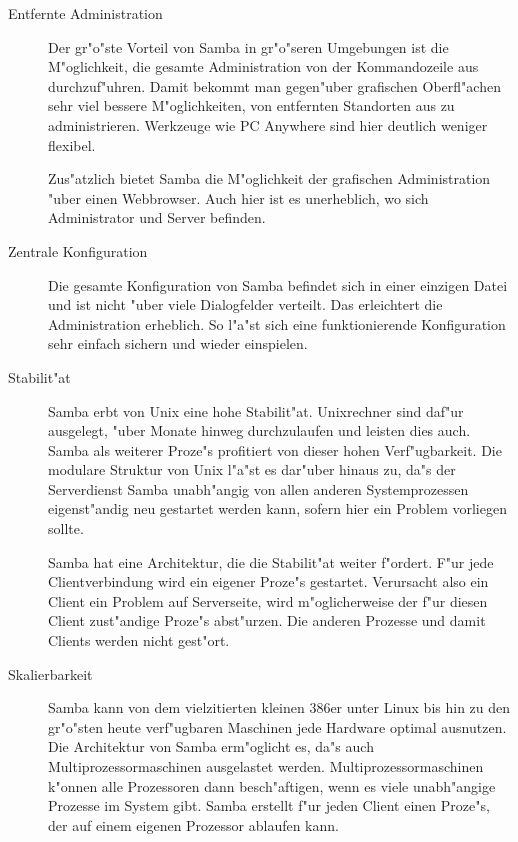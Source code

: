 \documentclass{scrartcl}\usepackage{pslatex}\typearea{12}
\begin{document}
\begin{description}
  
\item[Entfernte Administration] Der gr"o"ste Vorteil von Samba in
  gr"o"seren Umgebungen ist die M"oglichkeit, die gesamte
  Administration von der Kommandozeile aus durchzuf"uhren. Damit
  bekommt man gegen"uber grafischen Oberfl"achen sehr viel bessere
  M"oglichkeiten, von entfernten Standorten aus zu administrieren.
  Werkzeuge wie PC Anywhere sind hier deutlich weniger flexibel.
  
  Zus"atzlich bietet Samba die M"oglichkeit der grafischen
  Administration "uber einen Webbrowser. Auch hier ist es unerheblich,
  wo sich Administrator und Server befinden.
  
\item[Zentrale Konfiguration] Die gesamte Konfiguration von Samba
  befindet sich in einer einzigen Datei und ist nicht "uber viele
  Dialogfelder verteilt. Das erleichtert die Administration erheblich.
  So l"a"st sich eine funktionierende Konfiguration sehr einfach
  sichern und wieder einspielen.
  
\item[Stabilit"at] Samba erbt von Unix eine hohe Stabilit"at.
  Unixrechner sind daf"ur ausgelegt, "uber Monate hinweg durchzulaufen
  und leisten dies auch. Samba als weiterer Proze"s profitiert von
  dieser hohen Verf"ugbarkeit. Die modulare Struktur von Unix l"a"st
  es dar"uber hinaus zu, da"s der Serverdienst Samba unabh"angig von
  allen anderen Systemprozessen eigenst"andig neu gestartet werden
  kann, sofern hier ein Problem vorliegen sollte.
  
  Samba hat eine Architektur, die die Stabilit"at weiter f"ordert.
  F"ur jede Clientverbindung wird ein eigener Proze"s gestartet.
  Verursacht also ein Client ein Problem auf Serverseite, wird
  m"oglicherweise der f"ur diesen Client zust"andige Proze"s
  abst"urzen. Die anderen Prozesse und damit Clients werden nicht
  gest"ort.
  
\item[Skalierbarkeit] Samba kann von dem vielzitierten kleinen 386er
  unter Linux bis hin zu den gr"o"sten heute verf"ugbaren Maschinen
  jede Hardware optimal ausnutzen. Die Architektur von Samba
  erm"oglicht es, da"s auch Multiprozessormaschinen ausgelastet
  werden. Multiprozessormaschinen k"onnen alle Prozessoren dann
  besch"aftigen, wenn es viele unabh"angige Prozesse im System gibt.
  Samba erstellt f"ur jeden Client einen Proze"s, der auf einem
  eigenen Prozessor ablaufen kann.


\end{description}
\end{document}
